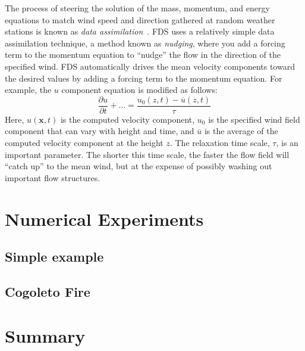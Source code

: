 \documentclass[journal,article,atmosphere,submit,moreauthors,pdftex]{Definitions/mdpi}
\begin{document}
The process of steering the solution of the mass, momentum, and energy equations to match wind speed and direction gathered at random weather stations is known as \emph{data assimilation}~\cite{Kalnay:2003}. FDS uses a relatively simple data assimilation technique, a method known as \emph{nudging}, where you add a forcing term to the momentum equation to ``nudge'' the flow in the direction of the specified wind. FDS automatically drives the mean velocity components toward the desired values by adding a forcing term to the momentum equation. For example, the $u$ component equation is modified as follows:
\begin{equation}
   \frac{\partial u}{\partial t} + \ldots = \frac{u_0(z,t)-\overline{u}(z,t)}{\tau} \label{mean_forcing_u}
\end{equation}
Here, $u(\mathbf{x},t)$ is the computed velocity component, $u_0$ is the specified wind field component that can vary with height and time, and $\overline{u}$ is the average of the computed velocity component at the height $z$. The relaxation time scale, $\tau$, is an important parameter. The shorter this time scale, the faster the flow field will ``catch up'' to the mean wind, but at the expense of possibly washing out important flow structures.

\section{Numerical Experiments} \label{sec:numexp}





\subsection{Simple example}  \label{sec:simexp}




\subsection{Cogoleto Fire}  \label{sec:cogo}




\section{Summary} \label{sec:summary}
\end{document}
